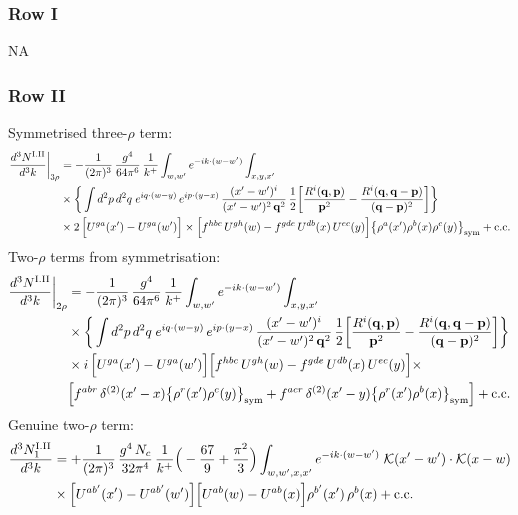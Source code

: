 \documentclass[9pt]{article}
\numberwithin{equation}{section}
\begin{document}
\subsubsection*{Row I}
\textsc{NA}
\subsubsection*{Row II}
Symmetrised three-$\rho$ term:
\begin{align}
\frac{d^{3}N^{\rm I.II}}{d^{3}k}\bigg|_{3\rho}&=-\frac{1}{(2\pi)^{3}}\,\frac{g^{4}}{64\pi^{6}}\,\frac{1}{k^{+}}\int_{w,w'}e^{-ik\cdot{(w-w')}}\int_{x,y,x'}\notag\\
&\times\bigg\{\int d^{2}p\,d^{2}q\;e^{iq\cdot(w-y)}\,e^{ip\cdot(y-x)}\,\frac{(x'-w')^{i}}{(x'-w')^{2}\,\mathbf{q}^{2}}\,\frac{1}{2}\bigg[\frac{R^{i}(\mathbf{q},\mathbf{p})}{\mathbf{p}^{2}}-\frac{R^{i}(\mathbf{q},\mathbf{q}-\mathbf{p})}{(\mathbf{q}-\mathbf{p})^{2}}\bigg]\bigg\}\notag\\
&\times 2\,\Big[U^{ga}(x')-U^{ga}(w')\Big]\times \Big[f^{hbc}\,U^{gh}(w)-f^{gde}\,U^{db}(x)\,U^{ec}(y)\Big]\big\{\rho^{a}(x')\rho^{b}(x)\rho^{c}(y)\big\}_{\rm sym}+{\rm c.c.}\label{eq:D-I.II-3}
\end{align}
Two-$\rho$ terms from symmetrisation:
\begin{align}
\frac{d^{3}N^{\rm I.II}}{d^{3}k}\bigg|_{2\rho}&=-\frac{1}{(2\pi)^{3}}\,\frac{g^{4}}{64\pi^{6}}\,\frac{1}{k^{+}}\int_{w,w'}e^{-ik\cdot{(w-w')}}\int_{x,y,x'}\notag\\
&\times\bigg\{\int d^{2}p\,d^{2}q\;e^{iq\cdot(w-y)}\,e^{ip\cdot(y-x)}\,\frac{(x'-w')^{i}}{(x'-w')^{2}\,\mathbf{q}^{2}}\,\frac{1}{2}\bigg[\frac{R^{i}(\mathbf{q},\mathbf{p})}{\mathbf{p}^{2}}-\frac{R^{i}(\mathbf{q},\mathbf{q}-\mathbf{p})}{(\mathbf{q}-\mathbf{p})^{2}}\bigg]\bigg\}\notag\\
&\times i\,\Big[U^{ga}(x')-U^{ga}(w')\Big]\Big[f^{hbc}\,U^{gh}(w)-f^{gde}\,U^{db}(x)\,U^{ec}(y)\Big]\times\notag \\ & \Big[f^{abr}\,\delta^{(2)}(x'-x)\big\{\rho^{r}(x')\rho^{c}(y)\big\}_{\rm sym}+f^{acr}\,\delta^{(2)}(x'-y)\big\{\rho^{r}(x')\rho^{b}(x)\big\}_{\rm sym}\Big]+{\rm c.c.}\label{eq:D-I.II-2}
\end{align}
Genuine two-$\rho$ term:
\begin{align}
\frac{d^{3}N^{\rm I.II}_{1}}{d^{3}k} & = +\frac{1}{(2\pi)^{3}}\,\frac{g^{4}\,N_{c}}{32\pi^{4}}\,\frac{1}{k^{+}}\Big(-\frac{67}{9}+\frac{\pi^{2}}{3}\Big)\int_{w,w',x,x'} e^{-ik\cdot{(w-w')}}\;\mathcal{K}(x'-w')\cdot\mathcal{K}(x-w)\notag \\
& \times\Big[U^{ab'}(x')-U^{ab'}(w')\Big]\Big[U^{ab}(w)-U^{ab}(x)\Big]\rho^{b'}(x')\,\rho^{b}(x) + {\rm c.c.}\label{eq:D-I.II-2o}
\end{align}
\end{document}
